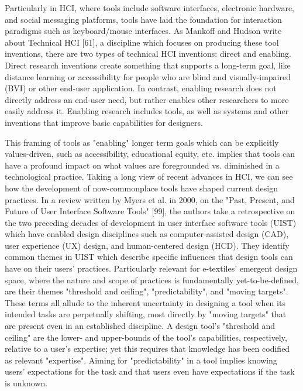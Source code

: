 Particularly in HCI, where tools include software interfaces, electronic hardware, and social messaging platforms, tools have laid the foundation for interaction paradigms such as keyboard/mouse interfaces. As Mankoff and Hudson write about Technical HCI [61], a discipline which focuses on producing these tool inventions, there are two types of technical HCI inventions: direct and enabling. Direct research inventions create something that supports a long-term goal, like distance learning or accessibility for people who are blind and visually-impaired (BVI) or other end-user application. In contrast, enabling research does not directly address an end-user need, but rather enables other researchers to more easily address it. Enabling research includes tools, as well as systems and other inventions that improve basic capabilities for designers.

This framing of tools as "enabling" longer term goals which can be explicitly values-driven, such as accessibility, educational equity, etc. implies that tools can have a profound impact on what values are foregrounded vs. diminished in a technological practice. Taking a long view of recent advances in HCI, we can see how the development of now-commonplace tools have shaped current design practices. In a review written by Myers et al. in 2000, on the "Past, Present, and Future of User Interface Software Tools" [99], the authors take a retrospective on the two preceding decades of development in user interface software tools (UIST) which have enabled design disciplines such as computer-assisted design (CAD), user experience (UX) design, and human-centered design (HCD). They identify common themes in UIST which describe specific influences that design tools can have on their users' practices. Particularly relevant for e-textiles' emergent design space, where the nature and scope of practices is fundamentally yet-to-be-defined, are their themes "threshold and ceiling", "predictability", and "moving targets". These terms all allude to the inherent uncertainty in designing a tool when its intended tasks are perpetually shifting, most directly by "moving targets" that are present even in an established discipline. A design tool's "threshold and ceiling" are the lower- and upper-bounds of the tool's capabilities, respectively, relative to a user's expertise; yet this requires that knowledge has been codified as relevant "expertise". Aiming for "predictability" in a tool implies knowing users' expectations for the task and that users even have expectations if the task is unknown. 

